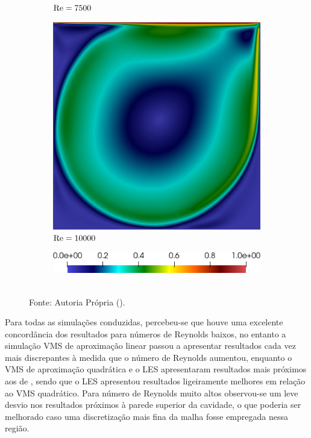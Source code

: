 \begin{figure}[h!]
\begin{subfigure}{0.32\textwidth}
        \caption{$\mathrm{Re}=7500$}
    \end{subfigure}
    \begin{subfigure}{0.32\textwidth}
        \includegraphics[width=\linewidth]{Figuras/Cavity/Re10000.png}
        \caption{$\mathrm{Re}=10000$}
    \end{subfigure}
    \begin{subfigure}{0.4\textwidth}
        \includegraphics[width=\linewidth]{Figuras/Cavity/Legenda.png}
    \end{subfigure}
    \\Fonte: Autoria Própria (\the\year).
    \label{fig:cavity-results2}
\end{figure}

Para todas as simulações conduzidas, percebeu-se que houve uma excelente concordância dos resultados para números de Reynolds baixos, no entanto a simulação VMS de aproximação linear passou a apresentar resultados cada vez mais discrepantes à medida que o número de Reynolds aumentou, enquanto o VMS de aproximação quadrática e o LES apresentaram resultados mais próximos aos de , sendo que o LES apresentou resultados ligeiramente melhores em relação ao VMS quadrático. Para número de Reynolds muito altos observou-se um leve desvio nos resultados próximos à parede superior da cavidade, o que poderia ser melhorado caso uma discretização mais fina da malha fosse empregada nessa região.